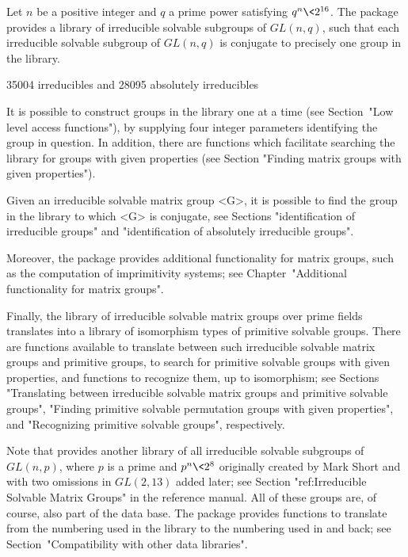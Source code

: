 
Let $n$ be a positive integer and $q$ a prime power satisfying  $q^n \<
2^{16}$. The package {\IRREDSOL} provides a library of irreducible
solvable subgroups of $GL(n, q)$, such that each irreducible solvable
subgroup of $GL(n, q)$ is conjugate to precisely one group in the library. 

35004 irreducibles and 28095 absolutely irreducibles

It is possible to construct groups in the {\IRREDSOL} 
library one at a time (see Section~"Low
level access functions"), by supplying four integer parameters identifying
the group in question. In addition, there are functions which facilitate 
searching the library for groups with given properties (see Section "Finding
matrix groups with given properties").

Given an irreducible solvable matrix group <G>, it is possible
to find the group in the library to which <G> is conjugate, see Sections
"identification of irreducible groups" and "identification of absolutely
irreducible groups".

Moreover, the {\IRREDSOL} package provides additional functionality
for matrix groups, such as the computation of imprimitivity systems;
see Chapter~"Additional functionality for matrix groups".

Finally, the library of irreducible solvable matrix groups over prime
fields translates into a library of isomorphism types of primitive solvable
groups. There are functions available to translate between such irreducible solvable
matrix groups and primitive groups, to search for primitive solvable groups with given 
properties, and functions to recognize them, up to isomorphism; 
see Sections "Translating between irreducible solvable matrix groups and primitive
solvable groups", "Finding primitive solvable permutation groups with given
properties",
and "Recognizing primitive solvable groups", respectively.

Note that {\GAP} provides another library of all irreducible solvable
subgroups of $GL(n, p)$, where $p$ is a prime and $p^n \< 2^8$ originally
created by Mark Short and with two omissions in $GL(2,13)$ added later; 
see Section "ref:Irreducible Solvable Matrix Groups" in the {\GAP} reference manual. All of
these groups are,  of course, also part of the {\IRREDSOL} data base. The {\IRREDSOL}
package provides functions to translate from the numbering used in the {\GAP} library
to the numbering used in {\IRREDSOL} and back; see
Section~"Compatibility with other data libraries".

